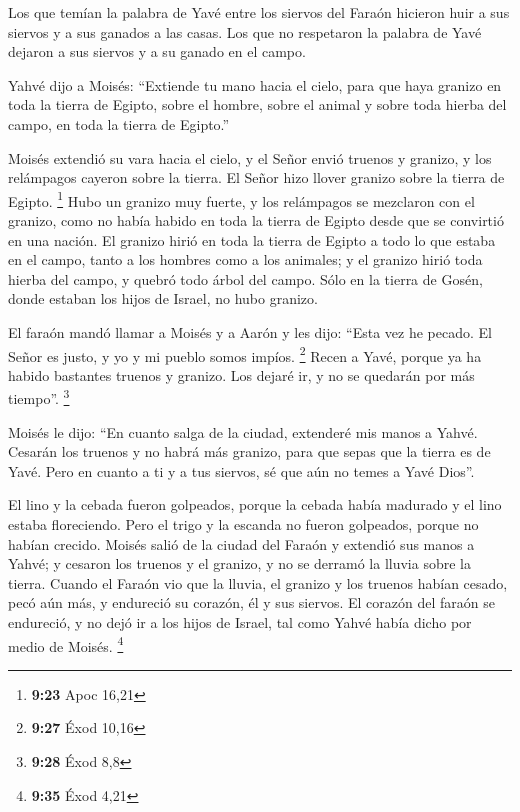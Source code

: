  Los que temían la palabra de Yavé entre los siervos del
Faraón hicieron huir a sus siervos y a sus ganados a las casas.
 Los que no respetaron la palabra de Yavé dejaron a sus
siervos y a su ganado en el campo.

 Yahvé dijo a Moisés: ``Extiende tu mano hacia el cielo,
para que haya granizo en toda la tierra de Egipto, sobre el hombre,
sobre el animal y sobre toda hierba del campo, en toda la tierra de
Egipto.''

 Moisés extendió su vara hacia el cielo, y el Señor envió
truenos y granizo, y los relámpagos cayeron sobre la tierra. El Señor
hizo llover granizo sobre la tierra de Egipto. \footnote{\textbf{9:23}
  Apoc 16,21}  Hubo un granizo muy fuerte, y los
relámpagos se mezclaron con el granizo, como no había habido en toda la
tierra de Egipto desde que se convirtió en una nación. 
El granizo hirió en toda la tierra de Egipto a todo lo que estaba en el
campo, tanto a los hombres como a los animales; y el granizo hirió toda
hierba del campo, y quebró todo árbol del campo.  Sólo en
la tierra de Gosén, donde estaban los hijos de Israel, no hubo granizo.

 El faraón mandó llamar a Moisés y a Aarón y les dijo:
``Esta vez he pecado. El Señor es justo, y yo y mi pueblo somos impíos.
\footnote{\textbf{9:27} Éxod 10,16}  Recen a Yavé, porque
ya ha habido bastantes truenos y granizo. Los dejaré ir, y no se
quedarán por más tiempo''. \footnote{\textbf{9:28} Éxod 8,8}

 Moisés le dijo: ``En cuanto salga de la ciudad,
extenderé mis manos a Yahvé. Cesarán los truenos y no habrá más granizo,
para que sepas que la tierra es de Yavé.  Pero en cuanto
a ti y a tus siervos, sé que aún no temes a Yavé Dios''.

 El lino y la cebada fueron golpeados, porque la cebada
había madurado y el lino estaba floreciendo.  Pero el
trigo y la escanda no fueron golpeados, porque no habían crecido.
 Moisés salió de la ciudad del Faraón y extendió sus
manos a Yahvé; y cesaron los truenos y el granizo, y no se derramó la
lluvia sobre la tierra.  Cuando el Faraón vio que la
lluvia, el granizo y los truenos habían cesado, pecó aún más, y
endureció su corazón, él y sus siervos.  El corazón del
faraón se endureció, y no dejó ir a los hijos de Israel, tal como Yahvé
había dicho por medio de Moisés. \footnote{\textbf{9:35} Éxod 4,21}

